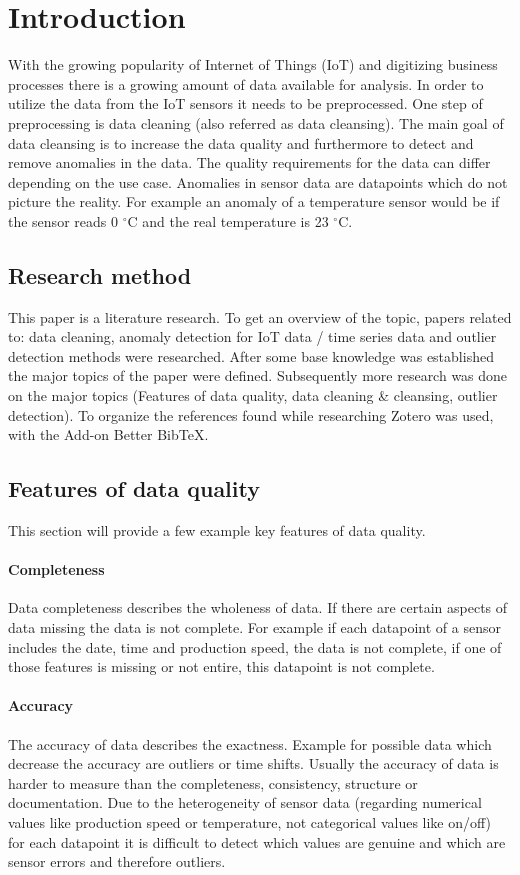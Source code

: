 \chapter{Introduction}

With the growing popularity of Internet of Things (\ac{IoT}) and digitizing business processes there is a growing amount of data available for analysis.
In order to utilize the data from the IoT sensors it needs to be preprocessed. One step of preprocessing is data cleaning (also referred as data cleansing).
The main goal of data cleansing is to increase the data quality and furthermore to detect and remove anomalies in the data. The quality requirements for the data can differ depending on the use case. Anomalies in sensor data are datapoints which do not picture the reality. For example an anomaly of a temperature sensor would be if the sensor reads 0 $^{\circ}$C and the real temperature is 23 $^{\circ}$C.

\section{Research method}
This paper is a literature research. To get an overview of the topic, papers related to: data cleaning, anomaly detection for IoT data / time series data and outlier detection methods were researched. After some base knowledge was established the major topics of the paper were defined. Subsequently more research was done on the major topics (Features of data quality, data cleaning \& cleansing, outlier detection). To organize the references found while researching Zotero was used, with the Add-on Better BibTeX.

\section{Features of data quality}\label{data-quality-features}
This section will provide a few example key features of data quality. 
\subsubsection{Completeness}
Data completeness describes the wholeness of data. If there are certain aspects of data missing the data is not complete. For example if each datapoint of a sensor includes the date, time and production speed, the data is not complete, if one of those features is missing or not entire, this datapoint is not complete. \cite{caiChallengesDataQuality2015, songIoTDataQuality2020}
\subsubsection{Accuracy}
The accuracy of data describes the exactness. Example for possible data which decrease the accuracy are outliers or time shifts. Usually the accuracy of data is harder to measure than the completeness, consistency, structure or documentation. Due to the heterogeneity of sensor data (regarding numerical values like production speed or temperature, not categorical values like on/off) for each datapoint it is difficult to detect which values are genuine and which are sensor errors and therefore outliers. \cite{caiChallengesDataQuality2015}

